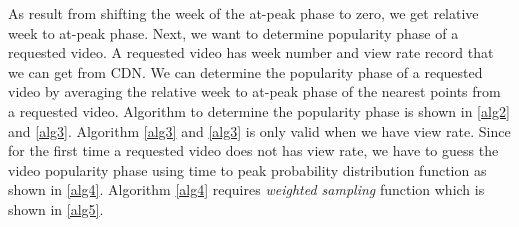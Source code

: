 \documentclass[10pt,final,journal,a4paper]{IEEEtran}
\begin{document}
As result from shifting the week of the at-peak phase to zero, we get relative week to at-peak phase. 
Next, we want to determine popularity phase of a requested video.  
A requested video has week number and view rate record that we can get from CDN. 
We can determine the popularity phase of a requested video by averaging the relative week to at-peak phase of the nearest points from a requested video.  
Algorithm to determine the popularity phase is shown in \ref{alg2} and \ref{alg3}.
Algorithm \ref{alg3} and \ref{alg3} is only valid when we have view rate.
Since for the first time a requested video does not has view rate, we have to guess the video popularity phase using time to peak probability distribution function as shown in \ref{alg4}. 
Algorithm \ref{alg4} requires \textit{weighted sampling} function which is shown in \ref{alg5}.




\end{document}
